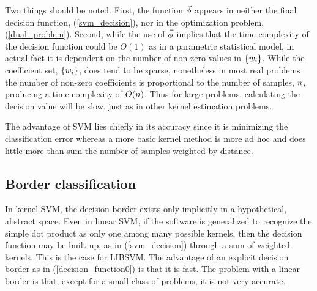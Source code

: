 \documentclass[11pt]{article}
\begin{document}
Two things should be noted. First, the function $\vec\phi$ appears in
neither the final decision function, (\ref{svm_decision}), nor in the
optimization problem, (\ref{dual_problem}). Second, while the use of
$\vec\phi$ implies that the time complexity of the decision function 
could be $O(1)$ as in a parametric statistical model, in actual fact it is
dependent on the number of non-zero values in $\lbrace w_i \rbrace$.
While the coefficient set, $\lbrace w_i \rbrace$, does tend to be sparse,
nonetheless in most real problems the number of non-zero coefficients is
proportional to the number of samples, $n$, producing a time complexity
of $O(n)$. Thus for large problems, calculating the decision value will
be slow, just as in other kernel estimation problems.

The advantage of SVM lies chiefly in its accuracy since it is minimizing the
classification error whereas a more basic kernel method is more ad hoc
and does little more than sum the number of samples weighted by distance.

\subsection{Border classification}

\label{border_method}

In kernel SVM, the decision border exists only implicitly in a hypothetical,
abstract space. Even in linear SVM, if the software is generalized to 
recognize the simple dot product as only one among many possible kernels,
then the decision function may be built up, as in (\ref{svm_decision})
through a sum of weighted kernels. This is the case for LIBSVM.
The advantage of an explicit decision border as in (\ref{decision_function0})
is that it is fast. The problem with a linear border is that, except for a
small class of problems, it is not very accurate.
\end{document}
